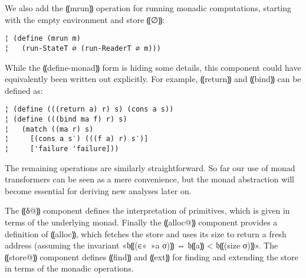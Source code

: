 We also add the ⸨mrun⸩ operation for running monadic computations, starting
with the empty environment and store ⸨∅⸩:
\begin{lstlisting}
¦ (define (mrun m)
¦   (run-StateT ∅ (run-ReaderT ∅ m)))
\end{lstlisting}
While the ⸨define-monad⸩ form is hiding some details, this component could have
equivalently been written out explicitly. For example, ⸨return⸩ and ⸨bind⸩ can
be defined as:
\begin{lstlisting}
¦ (define (((return a) r) s) (cons a s))
¦ (define (((bind ma f) r) s)
¦   (match ((ma r) s)
¦     [(cons a s′) (((f a) r) s′)]
¦     ['failure 'failure]))
\end{lstlisting}
The remaining operations are similarly straightforward.  So far our use of
monad transformers can be seen as a mere convenience, but the monad abstraction
will become essential for deriving new analyses later on.

The ⸨δ@⸩ component defines the interpretation of primitives, which is given in
terms of the underlying monad.  Finally the ⸨alloc@⸩ component provides a
definition of ⸨alloc⸩, which fetches the store and uses its size to return a
fresh address (assuming the invariant «𝔥⸨(∈«\ »a σ)⸩ ⇔ 𝔥⸨a⸩ < 𝔥⸨(size σ)⸩».
The ⸨store@⸩ component defines ⸨find⸩ and ⸨ext⸩ for finding and extending the
store in terms of the monadic operations.

